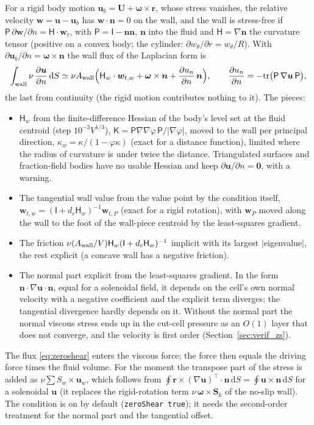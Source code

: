 \documentclass[11pt,a4paper]{article}
\theoremstyle{remark}
\newcommand{\uu}{\bm{u}}
\newcommand{\ub}{\uu_b}
\newcommand{\nn}{\bm{n}}
\newcommand{\dd}{\,\mathrm{d}}
\newcommand{\Aw}{A_{\rm wall}}
\newcommand{\code}[1]{\texttt{#1}}
\begin{document}
For a rigid body motion $\ub=\bm U+\bm\omega\times\bm r$, whose stress vanishes, the relative velocity
$\bm w=\uu-\ub$ has $\bm w\cdot\nn=0$ on the wall, and the wall is stress-free if
$\mathsf P\,\partial\bm w/\partial n=\mathsf H\cdot\bm w_t$, with $\mathsf P=\mathsf I-\nn\nn$,
$\nn$ into the fluid and $\mathsf H=\nabla\nn$ the curvature tensor (positive on a convex body; the
cylinder: $\partial w_\theta/\partial r=w_\theta/R$). With $\partial\ub/\partial n=\bm\omega\times\nn$
the wall flux of the Laplacian form is
\begin{equation}
\int_{\rm wall}\nu\,\frac{\partial\uu}{\partial n}\dd S\simeq\nu\Aw\Big(\mathsf H_w\cdot\bm w_{t,w}
+\bm\omega\times\nn+\frac{\partial u_n}{\partial n}\,\nn\Big),
\qquad \frac{\partial u_n}{\partial n}=-\mathrm{tr}\big(\mathsf P\,\nabla\uu\,\mathsf P\big),
\label{eq:zeroshear}
\end{equation}
the last from continuity (the rigid motion contributes nothing to it). The pieces:
\begin{itemize}\itemsep1pt
\item $\mathsf H_w$ from the finite-difference Hessian of the body's level set at the fluid centroid
(step $10^{-3}V^{1/3}$), $\mathsf K=\mathsf P\nabla\nabla\varphi\,\mathsf P/|\nabla\varphi|$, moved to the
wall per principal direction, $\kappa_w=\kappa/(1-\varphi\kappa)$ (exact for a distance function),
limited where the radius of curvature is under twice the distance. Triangulated surfaces and
fraction-field bodies have no usable Hessian and keep $\partial\uu/\partial n=\bm 0$, with a warning.
\item The tangential wall value from the value point by the condition itself,
$\bm w_{t,w}=(\mathsf I+d_c\mathsf H_w)^{-1}\bm w_{t,P}$ (exact for a rigid rotation), with $\bm w_P$ moved
along the wall to the foot of the wall-piece centroid by the least-squares gradient.
\item The friction $\nu(\Aw/V)\mathsf H_w(\mathsf I+d_c\mathsf H_w)^{-1}$ implicit with its largest
$|$eigenvalue$|$, the rest explicit (a concave wall has a negative friction).
\item The normal part explicit from the least-squares gradient. In the form $\nn\cdot\nabla\uu\cdot\nn$,
equal for a solenoidal field, it depends on the cell's own normal velocity with a negative coefficient
and the explicit term diverges; the tangential divergence hardly depends on it. Without the normal part
the normal viscous stress ends up in the cut-cell pressure as an $O(1)$ layer that does not converge,
and the velocity is first order (Section~\ref{sec:verif_zs}).
\end{itemize}
The flux \eqref{eq:zeroshear} enters the viscous force; the force then equals the driving force times the
fluid volume. For the moment the transpose part of the stress is added as
$\nu\sum S_w\times\uu_w$, which follows from $\oint\bm r\times(\nabla\uu)^{\!\top}\cdot\nn\dd S=\oint\uu\times\nn\dd S$
for a solenoidal $\uu$ (it replaces the rigid-rotation term $\nu\,\bm\omega\times\bm S_k$ of the no-slip
wall). The condition is on by default (\code{zeroShear true}); it needs the second-order treatment for
the normal part and the tangential offset.
\end{document}
